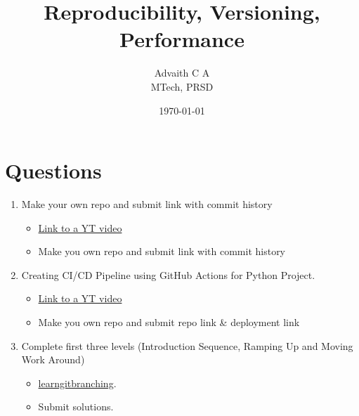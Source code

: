 \documentclass{article}
\title{Reproducibility, Versioning, Performance}
\author{Advaith C A \\MTech, PRSD}
\date{\today}
\begin{document}
    \setmainfont{Arial}
    \maketitle
    \section*{Questions}
    \begin{enumerate}
        \item Make your own repo and submit link with commit history
        \begin{itemize}
            \item \href{https://www.youtube.com/watch?v=8Dd7KRpKeaE}{Link to a YT video}
            \item Make you own repo and submit link with commit history
        \end{itemize}
        \item Creating CI/CD Pipeline using GitHub Actions for Python Project.
        \begin{itemize}
            \item \href{https://www.youtube.com/watch?v=WTofttoD2xg}{Link to a YT video}
            \item Make you own repo and submit repo link \& deployment link
        \end{itemize}
        \item Complete first three levels (Introduction Sequence, Ramping Up and Moving Work Around)
        \begin{itemize}
            \item \href{https://learngitbranching.js.org/}{learngitbranching}.
            \item Submit solutions.
        \end{itemize}
    \end{enumerate}
\end{document}
